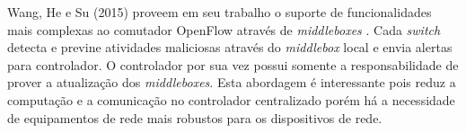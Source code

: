 %
Wang, He e Su (2015)\nocite{Wang:2015} proveem em seu trabalho o suporte de funcionalidades mais complexas ao comutador OpenFlow através de \textit{middleboxes} \cite{RFC3234}. Cada \textit{switch} detecta e previne atividades maliciosas através do \textit{middlebox} local e envia alertas para controlador. O controlador por sua vez possui somente a responsabilidade de prover a atualização dos \textit{middleboxes}. Esta abordagem é interessante pois reduz a computação e a comunicação no controlador centralizado porém há a necessidade de equipamentos de rede mais robustos para os dispositivos de rede.


